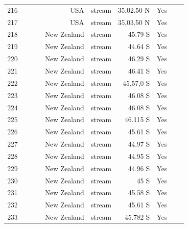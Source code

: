\documentclass[12pt]{article}
\begin{document}
\begin{landscape}
\begin{table}[h!]
\begin{tabular}{rrrrrrrrr}
      216   & ~\citet{GlobalWeb} & ~\citet{Thompson2003} & USA   & stream & 35,02,50 N & Yes   &       &  \\
      217   & ~\citet{GlobalWeb} & ~\citet{Thompson2003} & USA   & stream & 35,03,50 N & Yes   &       &  \\
      218   & ~\citet{GlobalWeb} & ~\citet{Thompson2004c} & New Zealand & stream & 45.79 S & Yes   &       &  \\
      219   & ~\citet{GlobalWeb} & ~\citet{Thompson2004c} & New Zealand & stream & 44.64 S & Yes   &       &  \\
      220   & ~\citet{GlobalWeb} & ~\citet{Thompson2004c} & New Zealand & stream & 46.29 S & Yes   &       &  \\
      221   & ~\citet{GlobalWeb} & ~\citet{Thompson2004c} & New Zealand & stream & 46.41 S & Yes   &       &  \\
      222   & ~\citet{GlobalWeb} & ~\citet{Thompson2004c} & New Zealand & stream & 45,57,0 S & Yes   &       &  \\
      223   & ~\citet{GlobalWeb} & ~\citet{Thompson2004c} & New Zealand & stream & 46.08 S & Yes   &       &  \\
      224   & ~\citet{GlobalWeb} & ~\citet{Thompson2004c} & New Zealand & stream & 46.08 S & Yes   &       &  \\
      225   & ~\citet{GlobalWeb} & ~\citet{Thompson2004c} & New Zealand & stream & 46.115 S & Yes   &       &  \\
      226   & ~\citet{GlobalWeb} & ~\citet{Thompson2004c} & New Zealand & stream & 45.61 S & Yes   &       &  \\
      227   & ~\citet{GlobalWeb} & ~\citet{Thompson2004c} & New Zealand & stream & 44.97 S & Yes   &       &  \\
      228   & ~\citet{GlobalWeb} & ~\citet{Thompson2004c} & New Zealand & stream & 44.95 S & Yes   &       &  \\
      229   & ~\citet{GlobalWeb} & ~\citet{Thompson2004c} & New Zealand & stream & 44.96 S & Yes   &       &  \\
      230   & ~\citet{GlobalWeb} & ~\citet{Thompson2004c} & New Zealand & stream & 45 S  & Yes   &       &  \\
      231   & ~\citet{GlobalWeb} & ~\citet{Thompson2004c} & New Zealand & stream & 45.58 S & Yes   &       &  \\
      232   & ~\citet{GlobalWeb} & ~\citet{Thompson2004c} & New Zealand & stream & 45.61 S & Yes   &       &  \\
      233   & ~\citet{GlobalWeb} & ~\citet{Thompson2004c} & New Zealand & stream & 45.782 S & Yes   &       &  \\

\end{tabular}
\end{table}
\end{landscape}
\end{document}
